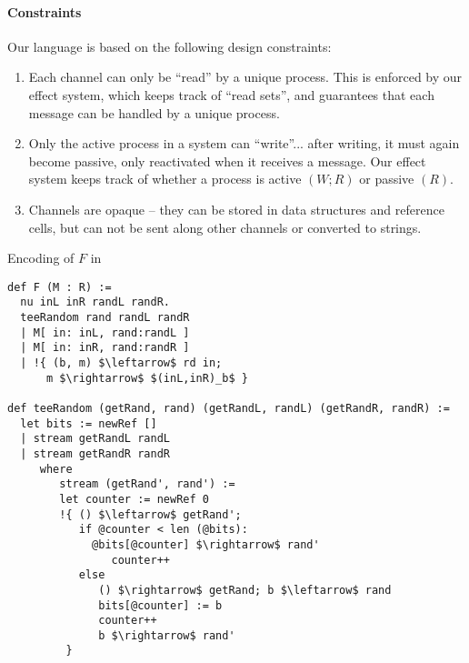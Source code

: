 \paragraph{Constraints}
Our language is based on the following design constraints:
\begin{enumerate}
\item Each channel can only be “read” by a unique process. This is enforced by our effect system, which keeps track of “read sets”, and guarantees that each message can be handled by a unique process.
\item Only the active process in a system can “write”... after writing, it must again become passive, only reactivated when it receives a message. Our effect system keeps track of whether a process is active $(W; R)$ or passive $(R)$.
\item Channels are opaque -- they can be stored in data structures and reference cells, but can not be sent along other channels or converted to strings.
\end{enumerate}



Encoding of $F$ in \lang
\begin{figure*}
\begin{lstlisting} 
def F (M : R) :=
  nu inL inR randL randR. 
  teeRandom rand randL randR
  | M[ in: inL, rand:randL ]
  | M[ in: inR, rand:randR ]
  | !{ (b, m) $\leftarrow$ rd in;
      m $\rightarrow$ $(inL,inR)_b$ }

def teeRandom (getRand, rand) (getRandL, randL) (getRandR, randR) :=
  let bits := newRef []
  | stream getRandL randL
  | stream getRandR randR
     where
        stream (getRand', rand') :=
        let counter := newRef 0
        !{ () $\leftarrow$ getRand';
           if @counter < len (@bits):
             @bits[@counter] $\rightarrow$ rand'
                counter++
           else
              () $\rightarrow$ getRand; b $\leftarrow$ rand
              bits[@counter] := b
              counter++
              b $\rightarrow$ rand'
         }
\end{lstlisting}
\end{figure*}

